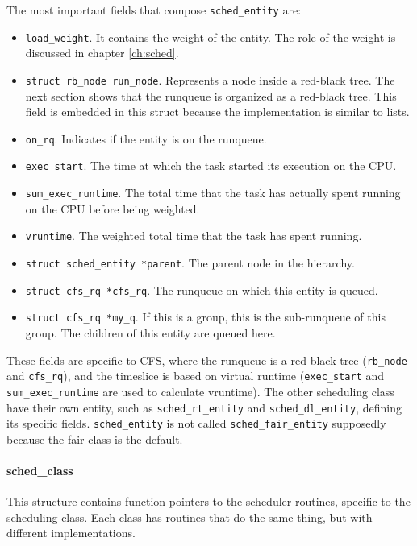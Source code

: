 The most important fields that compose \verb|sched_entity| are:
\begin{itemize}
    \item \verb|load_weight|. It contains the weight of the entity. The role of the weight is discussed in chapter \ref{ch:sched}.
    \item \verb|struct rb_node run_node|. Represents a node inside a red-black tree. The next section shows that the runqueue is organized as a red-black tree. This field is embedded in this struct because the implementation is similar to lists.
    \item \verb|on_rq|. Indicates if the entity is on the runqueue.
    \item \verb|exec_start|. The time at which the task started its execution on the CPU. %
    \item \verb|sum_exec_runtime|. The total time that the task has actually spent running on the CPU before being weighted.
    \item \verb|vruntime|. The weighted total time that the task has spent running.
    \item \verb|struct sched_entity *parent|. The parent node in the hierarchy.
    \item \verb|struct cfs_rq *cfs_rq|. The runqueue on which this entity is queued.
    \item \verb|struct cfs_rq *my_q|. If this is a group, this is the sub-runqueue of this group. The children of this entity are queued here.
\end{itemize}
These fields are specific to CFS, where the runqueue is a red-black tree (\verb|rb_node| and \verb|cfs_rq|), and the timeslice is based on virtual runtime (\verb|exec_start| and \verb|sum_exec_runtime| are used to calculate vruntime). The other scheduling class have their own entity, such as \verb|sched_rt_entity| and \verb|sched_dl_entity|, defining its specific fields. \verb|sched_entity| is not called \verb|sched_fair_entity| supposedly because the fair class is the default. 

\paragraph{sched\_class}
\label{sec:sched_class}
This structure contains function pointers to the scheduler routines, specific to the scheduling class. Each class has routines that do the same thing, but with different implementations.

